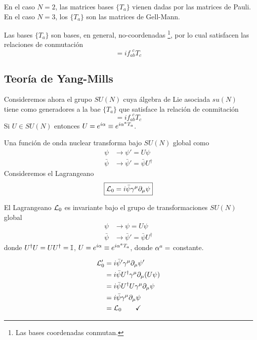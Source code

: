 En el caso $N=2$, las matrices bases $\{T_a\}$ vienen dadas por las matrices de Pauli. En el caso $N=3$, los $\{T_a\}$ son las matrices de Gell-Mann.

Las bases $\{T_a\}$ son bases, en general, no-coordenadas \footnote{Las bases coordenadas conmutan.}, por lo cual satisfacen las relaciones de conmutación
\begin{equation}
  [T_a,T_b]=if_{ab}^{~~c}T_c
\end{equation}

\subsection{Teoría de Yang-Mills}
Consideremos ahora el grupo $SU(N)$ cuya álgebra de Lie asociada $su(N)$ tiene como generadores a la bae $\{T_a\}$ que satisface la relación de conmitación
\begin{equation}
  [T_a,T_b]=if_{ab}^{~~c}T_c
\end{equation}
Si $U\in SU(N)$ entonces $U=e^{i\alpha }\equiv e^{i\alpha ^{a}T_a}$.

Una función de onda nuclear transforma bajo $SU(N)$ global como
\begin{align}
  \psi&\to \psi'=U\psi\\
  \bar{\psi}&\to \bar{\psi}'=\bar{\psi}U^\dagger
\end{align}
Consideremos el Lagrangeano
\begin{equation}
  \boxed{\mathcal{L}_0=i\bar{\psi}\gamma^\mu \partial_\mu \psi}
\end{equation}

\begin{teor}
	El Lagrangeano $\mathcal{L}_0$ es invariante bajo el grupo de transformaciones $SU(N)$ global
	\begin{align}
  \psi&\to \psi=U\psi\\
  \bar{\psi}&\to \bar{\psi}'=\bar{\psi}U^\dagger
\end{align}
donde $U^\dagger U=UU^\dagger=\mathbb{I}$, $U=e^{i\alpha }\equiv e^{i\alpha^{a}T_a}$, donde $\alpha^{a}=$ constante.
\end{teor}

\begin{prueba}
	\begin{align}
  \mathcal{L}_0'&=i\bar{\psi}'\gamma^\mu \partial_\mu \psi'\\&=i\bar{\psi}U^\dagger \gamma^\mu \partial_\mu (U\psi)\\
  &=i\bar{\psi}U^\dagger U\gamma^\mu\partial_\mu \psi\\
  &=i\bar{\psi}\gamma^\mu \partial_\mu \psi\\
  &=\mathcal{L}_0\qquad \checkmark 
\end{align}
\end{prueba}

